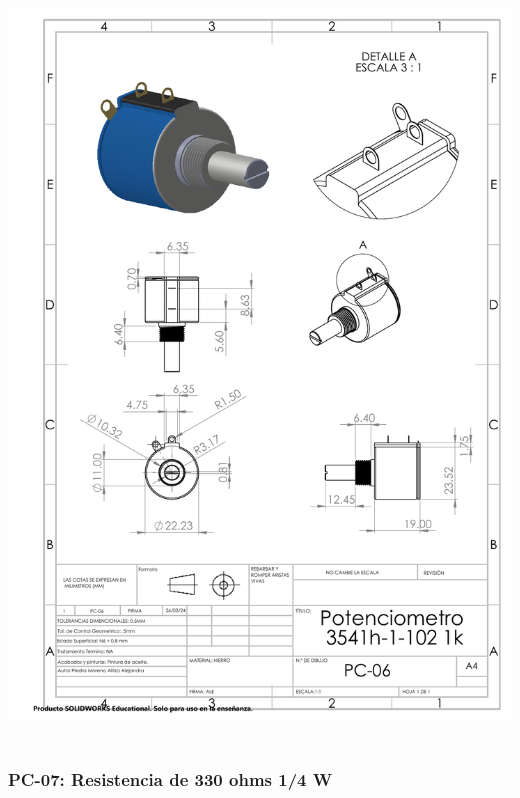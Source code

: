 \begin{center}
\includegraphics[width=.85\textwidth]{22/img/potenciometroDibujo.PDF}~\\[15cm]
\end{center}


\subsubsection{PC-07: Resistencia de 330 ohms 1/4 W }


